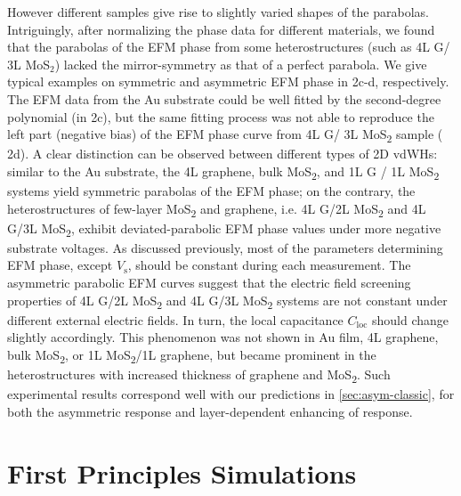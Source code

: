 %
However different
samples give rise to slightly varied shapes of the parabolas.
%
Intriguingly, after normalizing the phase data for different
materials, we found that the parabolas of the EFM phase from some
heterostructures (such as 4L G/ 3L MoS$_{2}$) lacked the
mirror-symmetry as that of a perfect parabola.
%
We give typical
examples on symmetric and asymmetric EFM phase in 
2c-d, respectively. The EFM data from the Au substrate could be well
fitted by the second-degree polynomial (in
 2c), but the same fitting process was not able to
reproduce the left part (negative bias) of the EFM phase curve from 4L G/ 3L
MoS\textsubscript{2} sample (
2d).
%
A clear distinction can be observed between different types of 2D
vdWHs: similar to the Au substrate, the 4L graphene, bulk
MoS\textsubscript{2}, and 1L G / 1L MoS\textsubscript{2} systems yield
symmetric parabolas of the EFM phase; on the contrary, the
heterostructures of few-layer MoS\textsubscript{2} and graphene,
i.e. 4L G/2L MoS\textsubscript{2} and 4L G/3L
MoS\textsubscript{2}, exhibit deviated-parabolic EFM phase
values under more negative substrate voltages.
%
%
As discussed previously, most of the parameters determining EFM phase,
except $V_{\mathrm{s}}$, should be constant during each
measurement. The asymmetric parabolic EFM curves suggest that the
electric field screening properties of 4L G/2L MoS\textsubscript{2} and 4L G/3L MoS\textsubscript{2} systems are not
constant under different external electric fields. In turn, the local capacitance $C_{\mathrm{loc}}$ should change slightly
accordingly. This phenomenon was not shown in Au film, 4L graphene,
bulk MoS\textsubscript{2}, or 1L MoS\textsubscript{2}/1L graphene, but
became prominent in the heterostructures with increased thickness of
graphene and MoS\textsubscript{2}.
%
Such experimental results correspond well with our predictions in
\autoref{sec:asym-classic}, for both the asymmetric response and
layer-dependent enhancing of response.

\section{First Principles Simulations}
\label{sec:mult-theor-model}

